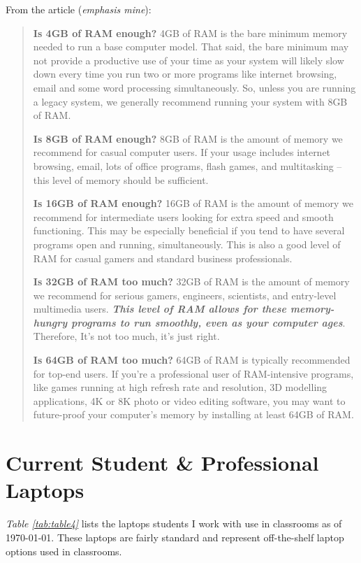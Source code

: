 From the article (\emph{emphasis mine}):
\begin{leftbar} \begin{quote}
\textbf{Is 4GB of RAM enough?}
4GB of RAM is the bare minimum memory needed to run a base computer model. That said, the bare minimum may not provide a productive use of your time as your system will likely slow down every time you run two or more programs like internet browsing, email and some word processing simultaneously. So, unless you are running a legacy system, we generally recommend running your system with 8GB of RAM.

\textbf{Is 8GB of RAM enough?}
8GB of RAM is the amount of memory we recommend for casual computer users. If your usage includes internet browsing, email, lots of office programs, flash games, and multitasking – this level of memory should be sufficient.

\textbf{Is 16GB of RAM enough?}
16GB of RAM is the amount of memory we recommend for intermediate users looking for extra speed and smooth functioning. This may be especially beneficial if you tend to have several programs open and running, simultaneously. This is also a good level of RAM for casual gamers and standard business professionals.

\textbf{Is 32GB of RAM too much?}
32GB of RAM is the amount of memory we recommend for serious gamers, engineers, scientists, and entry-level multimedia users. \textbf{\textit{This level of RAM allows for these memory-hungry programs to run smoothly, even as your computer ages}}. Therefore, It’s not too much, it’s just right.

\textbf{Is 64GB of RAM too much?}
64GB of RAM is typically recommended for top-end users. If you’re a professional user of RAM-intensive programs, like games running at  high refresh rate and resolution, 3D modelling applications, 4K or 8K photo or video editing software, you may want to future-proof your computer’s memory by installing at least 64GB of RAM.
\end{quote}
\end{leftbar}

\pagebreak\hypertarget{current-student-professional-laptops}{}\section{Current Student \& Professional Laptops}\label{current-student-professional-laptops}
\textit{Table \ref{tab:table4}} lists the laptops students I work with use in classrooms as of {\today}. These laptops are fairly standard and represent off-the-shelf laptop options used in classrooms.

